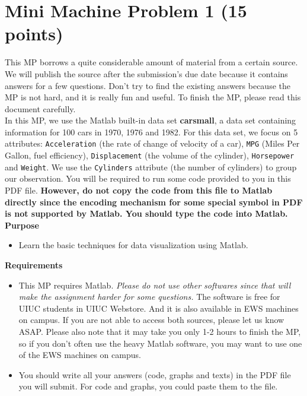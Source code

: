 \section*{Mini Machine Problem 1 (15 points)}
This MP borrows a quite considerable amount of material from a certain source. We will publish the source after the submission’s due date because it contains answers for a few questions. Don’t try to find the existing answers because the MP is not hard, and it is really fun and useful. To finish the MP, please read this document carefully.\\
In this MP, we use the Matlab  built-in data set \textbf{carsmall}, a data set containing information for 100 cars in 1970, 1976 and 1982. For this data set, we focus on 5 attributes: \texttt{Acceleration} (the rate of change of velocity of a car), \texttt{MPG} (Miles Per Gallon, fuel efficiency), \texttt{Displacement} (the volume of the cylinder), \texttt{Horsepower} and \texttt{Weight}. We use the \texttt{Cylinders} attribute (the number of cylinders) to group our observation. You will be required to run some code provided to you in this PDF file. \textbf{However, do not copy the code from this file to Matlab directly since the encoding mechanism for some special symbol in PDF is not supported by Matlab. You should type the code into Matlab.}\\

\textbf{Purpose} 
\begin{itemize}
\item Learn the basic techniques for data visualization using Matlab.
\end{itemize}
\textbf{Requirements} 
\begin{itemize}
\item This MP requires Matlab. \textit{Please do not use other softwares since that will make the assignment harder for some questions.} The software is free for UIUC students in UIUC Webstore. And it is also available in EWS machines on campus. If you are not able to access both sources, please let us know ASAP. Please also note that it may take you only 1-2 hours to finish the MP, so if you don’t often use the heavy Matlab software, you may want to use one of the EWS machines on campus.
\item You should write all your answers (code, graphs and texts) in the PDF file you will submit. For code and graphs, you could paste them to the file.  
\end{itemize}
 

